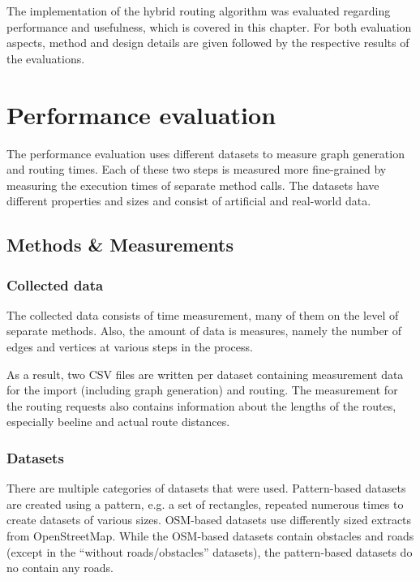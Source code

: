 
The implementation of the hybrid routing algorithm was evaluated regarding performance and usefulness, which is covered in this chapter.
For both evaluation aspects, method and design details are given followed by the respective results of the evaluations.

\section{Performance evaluation}

	The performance evaluation uses different datasets to measure graph generation and routing times.
	Each of these two steps is measured more fine-grained by measuring the execution times of separate method calls.
	The datasets have different properties and sizes and consist of artificial and real-world data.

	\subsection{Methods \& Measurements}

		\subsubsection{Collected data}
		
			The collected data consists of time measurement, many of them on the level of separate methods.
			Also, the amount of data is measures, namely the number of edges and vertices at various steps in the process.
			
			As a result, two CSV files are written per dataset containing measurement data for the import (including graph generation) and routing.
			The measurement for the routing requests also contains information about the lengths of the routes, especially beeline and actual route distances.
			
		
		\subsubsection{Datasets}
		\label{subsubsec:eval-datasets}
		
			There are multiple categories of datasets that were used.
			Pattern-based datasets are created using a pattern, e.g. a set of rectangles, repeated numerous times to create datasets of various sizes.
			OSM-based datasets use differently sized extracts from OpenStreetMap.
			While the OSM-based datasets contain obstacles and roads (except in the \enquote{without roads/obstacles} datasets), the pattern-based datasets do no contain any roads.
			
